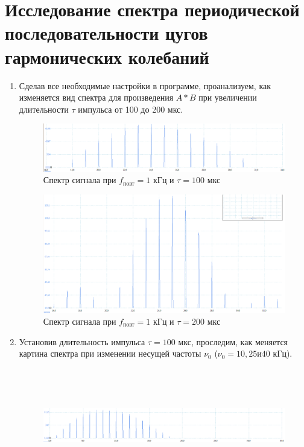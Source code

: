 \documentclass[12pt]{article}
\begin{document}
\section*{Исследование спектра периодической последовательности цугов гармонических колебаний}
\begin{enumerate}
	\item
		Сделав все необходимые настройки в программе, проанализуем, как изменяется вид спектра для произведения $A * B$ при увеличении длительности $\tau$ импульса от 100 до 200 мкс.
		\begin{figure}[h!]
			\centering
			\includegraphics[width = 12cm, height = 6 cm]{image5.png}
			\caption{Спектр сигнала при $f_\text{повт} = 1$ кГц и $\tau = 100$ мкс}
		\end{figure}
		\begin{figure}[h!]
			\centering
			\includegraphics[width = 12cm, height = 6 cm]{image6.png}
			\caption{Спектр сигнала при $f_\text{повт} = 1$ кГц и $\tau = 200$ мкс}
		\end{figure} 
	\item
		Установив длительность импульса $\tau = 100$ мкс, проследим, как меняется картина спектра при изменении несущей частоты $\nu_0$ ($\nu_0 = 10, 25 и 40$ кГц).
		\begin{figure}[h!]
			\centering
			\includegraphics[width = 14cm, height = 5cm]{image7.png}

\end{figure}
\end{enumerate}
\end{document}
